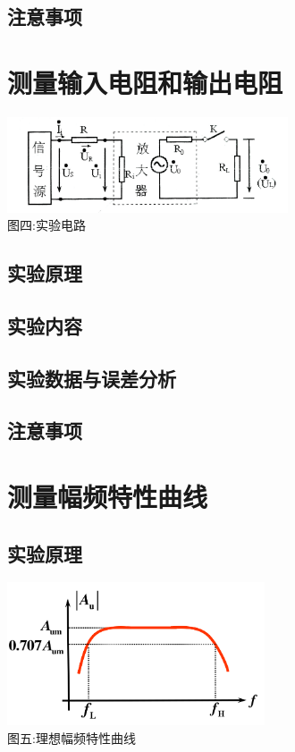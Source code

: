 \documentclass[a4paper]{article}
\begin{document}
    \subsection{注意事项}\label{subsec:8}


    \section{测量输入电阻和输出电阻}\label{sec:5}
    \begin{center}
        \includegraphics[height=80pt]{R}\\
        {\small 图四:实验电路}
    \end{center}

    \subsection{实验原理}\label{subsec:9}

    \subsection{实验内容}\label{subsec:10}

    \subsection{实验数据与误差分析}\label{subsec:11}

    \subsection{注意事项}\label{subsec:12}


    \section{测量幅频特性曲线}\label{sec:6}

    \subsection{实验原理}\label{subsec:13}
    \begin{center}
        \includegraphics[height=120pt]{Af}\\
        {\small 图五:理想幅频特性曲线}
    \end{center}
\end{document}
